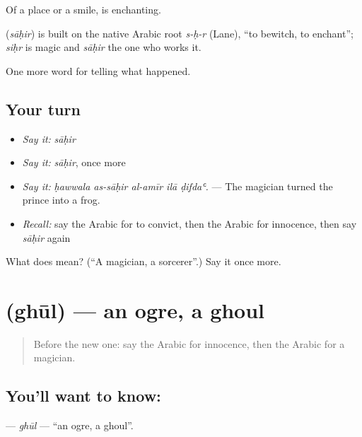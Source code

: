 Of a place or a smile,  is enchanting.

\begin{cousinweb}
\textbf{} (\emph{sāḥir}) is built on the native Arabic root \emph{s-ḥ-r} (Lane), \textquotedblleft{}to bewitch, to enchant\textquotedblright{}; \emph{siḥr} is magic and \emph{sāḥir} the one who works it.
\end{cousinweb}

\begin{grammarlens}[title={What you've built}]
One more word for telling what happened.
\end{grammarlens}

\subsection*{Your turn}
\begin{itemize}
\raggedright
  \item \emph{Say it:} \emph{sāḥir}
  \item \emph{Say it:} \emph{sāḥir}, once more
  \item \emph{Say it:} \emph{ḥawwala as-sāḥir al-amīr ilā ḍifdaʿ.} — The magician turned the prince into a frog.
  \item \emph{Recall:} say the Arabic for to convict, then the Arabic for innocence, then say \emph{sāḥir} again
\end{itemize}

\begin{tcolorbox}[breakable,colback=teal!4,colframe=teal!35!black,title={Before you move on}]
What does  mean? (\textquotedblleft{}A magician, a sorcerer\textquotedblright{}.) Say it once more.
\end{tcolorbox}
\section[\texorpdfstring{\ar{غول} (ghūl)}{غول (ghūl)}]{ (ghūl) — an ogre, a ghoul}

\label{lesson:AR-C335-ghul}



\begin{quote}
Before the new one: say the Arabic for innocence, then the Arabic for a magician.
\end{quote}

\subsection*{You'll want to know: }
\textbf{} — \emph{ghūl} — \textquotedblleft{}an ogre, a ghoul\textquotedblright{}.

